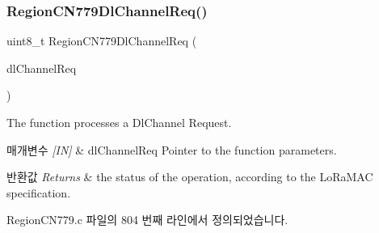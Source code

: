\subsubsection{\texorpdfstring{Region\+C\+N779\+Dl\+Channel\+Req()}{RegionCN779DlChannelReq()}}
{\footnotesize\ttfamily uint8\+\_\+t Region\+C\+N779\+Dl\+Channel\+Req (\begin{DoxyParamCaption}\item[{\mbox{\hyperlink{group___r_e_g_i_o_n_gae0d608ff1f8ea0a430e4f9a4c38ec7f3}{Dl\+Channel\+Req\+Params\+\_\+t}} $\ast$}]{dl\+Channel\+Req }\end{DoxyParamCaption})}



The function processes a Dl\+Channel Request. 


\begin{DoxyParams}{매개변수}
{\em \mbox{[}\+I\+N\mbox{]}} & dl\+Channel\+Req Pointer to the function parameters.\\
\hline
\end{DoxyParams}

\begin{DoxyRetVals}{반환값}
{\em Returns} & the status of the operation, according to the Lo\+Ra\+M\+AC specification. \\
\hline
\end{DoxyRetVals}


Region\+C\+N779.\+c 파일의 804 번째 라인에서 정의되었습니다.


